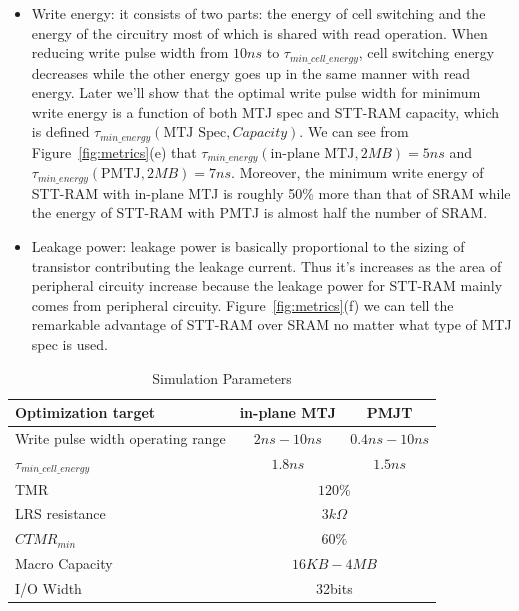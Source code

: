 \begin{itemize}
\item Write energy: it consists of two parts: the energy of cell switching and the energy of the circuitry most of which is shared with read operation. When reducing write pulse width from $10ns$ to $\tau_{min\_cell\_energy}$, cell switching energy decreases while the other energy goes up in the same manner with read energy. Later we'll show that the optimal write pulse width for minimum write energy is a function of both MTJ spec and STT-RAM capacity, which is defined $\tau_{min\_energy}(\text{MTJ Spec}, Capacity)$. We can see from Figure~\ref{fig:metrics}(e) that $\tau_{min\_energy}(\text{in-plane MTJ}, 2MB) = 5ns$ and $\tau_{min\_energy}(\text{PMTJ}, 2MB) = 7ns$. Moreover, the minimum write energy of STT-RAM with in-plane MTJ is roughly 50\% more than that of SRAM while the energy of STT-RAM with PMTJ is almost half the number of SRAM.
\item Leakage power: leakage power is basically proportional to the sizing of transistor contributing the leakage current. Thus it's increases as the area of peripheral circuity increase because the leakage power for STT-RAM mainly comes from peripheral circuity. Figure~\ref{fig:metrics}(f) we can tell the remarkable advantage of STT-RAM over SRAM no matter what type of MTJ spec is used.
\end{itemize} 


\begin{table}[t]
\centering
\caption{Simulation Parameters}
\label{tb:parameters}
\vspace{-5pt}
\begin{tabular}{ l | c | c }
\hline \hline
Optimization target & in-plane MTJ & PMJT\\
\hline
Write pulse width operating range & $2ns-10ns$ & $0.4ns-10ns$\\
\hline
$\tau_{min\_cell\_energy}$ & $1.8ns$ & $1.5ns$\\
\hline
TMR & \multicolumn{2}{c}{$120\%$}\\
\hline
LRS resistance & \multicolumn{2}{c}{$3k\Omega$}\\
\hline
$CTMR_{min}$ & \multicolumn{2}{c}{$60\%$} \\
\hline
Macro Capacity & \multicolumn{2}{c}{$16KB - 4MB$}\\
\hline
I/O Width & \multicolumn{2}{c}{32bits}\\
\hline\hline
\end{tabular}
\vspace{-10pt}
\end{table}    

